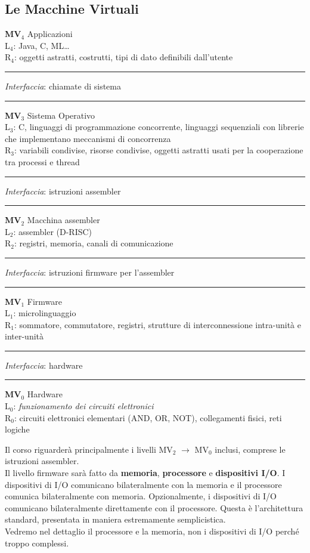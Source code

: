 \documentclass[10pt]{report}
\begin{document}
\subsection{Le Macchine Virtuali}
\begin{list}{}{}
\item \textbf{MV$_{4}$} Applicazioni\\L$_{4}$: Java, C, ML\ldots\\R$_{4}$: oggetti astratti, costrutti, tipi di dato definibili dall'utente
\item \rule{5cm}{1pt} \textit{Interfaccia}: chiamate di sistema \rule{5cm}{1pt}
\item \textbf{MV$_{3}$} Sistema Operativo\\L$_{3}$: C, linguaggi di programmazione concorrente, linguaggi sequenziali con librerie che implementano meccanismi di concorrenza\\R$_{3}$: variabili condivise, risorse condivise, oggetti astratti usati per la cooperazione tra processi e thread
\item \rule{5cm}{1pt} \textit{Interfaccia}: istruzioni assembler \rule{5cm}{1pt}
\item \textbf{MV$_{2}$} Macchina assembler\\L$_{2}$: assembler (D-RISC)\\R$_{2}$: registri, memoria, canali di comunicazione
\item \rule{5cm}{1pt} \textit{Interfaccia}: istruzioni firmware per l'assembler \rule{2.8cm}{1pt}
\item \textbf{MV$_{1}$} Firmware\\L$_{1}$: microlinguaggio\\R$_{1}$: sommatore, commutatore, registri, strutture di interconnessione intra-unità e inter-unità
\item \rule{5cm}{1pt} \textit{Interfaccia}: hardware \rule{6.7cm}{1pt}
\item \textbf{MV$_{0}$} Hardware\\L$_{0}$: \textit{funzionamento dei circuiti elettronici}\\R$_{0}$: circuiti elettronici elementari (AND, OR, NOT), collegamenti fisici, reti logiche
\end{list}
Il corso riguarderà principalmente i livelli MV$_{2}$ $\rightarrow$ MV$_{0}$ inclusi, comprese le istruzioni assembler.\\
Il livello firmware sarà fatto da \textbf{memoria}, \textbf{processore} e \textbf{dispositivi I/O}. I dispositivi di I/O comunicano bilateralmente con la memoria e il processore comunica bilateralmente con memoria. Opzionalmente, i dispositivi di I/O comunicano bilateralmente direttamente con il processore. Questa è l'architettura standard, presentata in maniera estremamente semplicistica.\\
Vedremo nel dettaglio il processore e la memoria, non i dispositivi di I/O perché troppo complessi.
\end{document}
